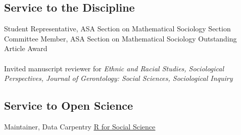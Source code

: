 \subsection*{Service to the Discipline}

 Student Representative, ASA Section on Mathematical Sociology Section  \\ 
 Committee Member, ASA Section on Mathematical Sociology Outstanding Article Award 
\\
\\
Invited manuscript reviewer for \emph{Ethnic and Racial Studies, Sociological Perspectives, Journal of Gerontology: Social Sciences, Sociological Inquiry}

\begin{comment}

09-2020 "Pandemic Norms and Politics: Understanding Social Reaction to Distancing and Stockpiling" Soc Persp, 1mo -  

07-2020 "A is for Apple, B is for Bulletproof: Sociological perspectives on the racialized fortification of the U.S. education system" Soc Inq, 1mo - Reject

07-2020 "Estimating older adult mortality from COVID-19" JGSS, 3w - Accept

06-2020 "Estimating older adult mortality from COVID-19" JGSS, 3w - R&R

03-2020 "Privileging Panethnicity? The Making of Middle-class Minority Identity in Hawai'i" Ethnic and Racial Studies. 1mo  - Reject

\end{comment}

\subsection*{Service to Open Science}
  Maintainer, 
Data Carpentry \href{https://carpentries.org/maintainers/}
{\underline{R for Social Science}} 